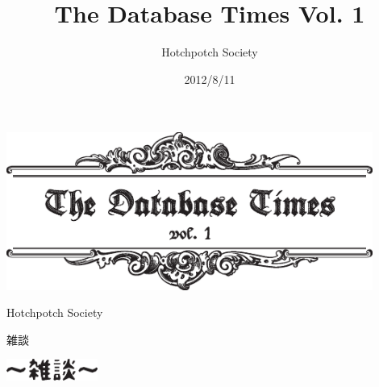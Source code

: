 \documentclass[b5paper,papersize,tombow,11pt]{jsbook}
\title{The Database Times Vol. 1}
\date{2012/8/11}
\author{Hotchpotch Society}
\begin{document}
\thispagestyle{empty}

\frontmatter

\begin{center}
 \includegraphics[width=12cm]{hayamiz/images/title.eps}
 \par\vspace*{50mm}
 \noindent Hotchpotch Society
\end{center}



\setcounter{tocdepth}{0} %
\tableofcontents

\mainmatter

\pagestyle{fancy}











\cleardoublepage
\plainifnotempty
{}
{\protect 雑談}

\begin{center}
 \includegraphics[width=3cm]{images/zatsudan.eps}
\end{center}

%
%

\footnotesize
\end{document}
